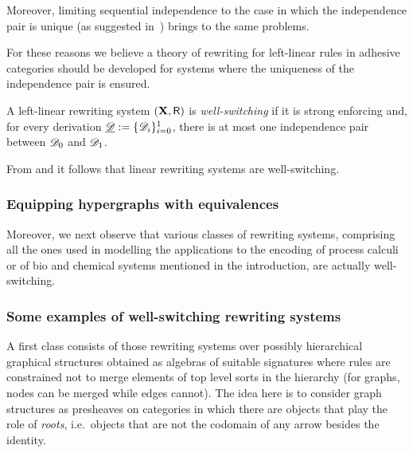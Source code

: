 Moreover, limiting sequential independence to the case in which the independence pair is unique (as suggested in~\cite{baldan2017domains}) brings to the same problems.

For these reasons we believe a theory of rewriting for
left-linear rules in adhesive categories should be developed for
systems where the uniqueness of the independence pair is ensured.

\begin{definition}
	A left-linear rewriting system $(\textbf {\textup{X}}, \mathsf{R})$ is \emph{well-switching} if it is strong enforcing and, for every derivation $\underline{\mathscr{D}}:=\{\mathscr{D}_{i}\}_{i=0}^1$, there is at most one independence pair between $\mathscr{D}_0$ and $\mathscr{D}_1$.
\end{definition}


\begin{remark}
	From  and  it follows that linear rewriting systems are well-switching.
\end{remark}


\subsubsection{Equipping hypergraphs with equivalences}


Moreover, we next observe that various classes of rewriting systems,
comprising all the ones used in modelling the applications to the
encoding of process calculi or of bio and chemical systems mentioned
in the introduction, are actually well-switching.

\subsubsection{Some examples of well-switching rewriting systems}


A first class consists of those rewriting systems over
possibly hierarchical graphical structures obtained as algebras of
suitable signatures where rules are constrained not to merge elements
of top level sorts in the hierarchy (for graphs, nodes can be
merged while edges cannot). The idea here is to consider graph
structures as presheaves on categories in which there are objects that play 
the role of \emph{roots}, i.e.~objects that are not the codomain of 
any arrow besides the identity. 

